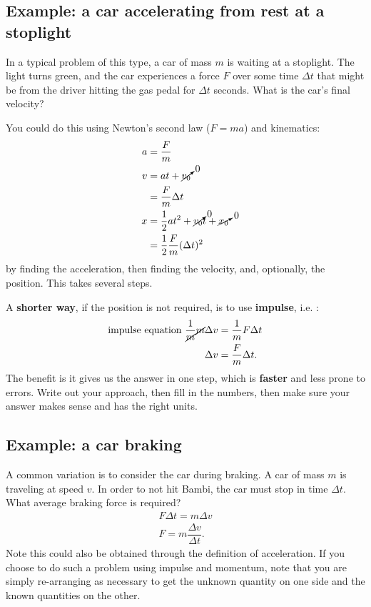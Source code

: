 \documentclass[handout]{tufte-handout}
\begin{document}
\subsection{Example: a car accelerating from rest at a stoplight}
In a typical problem of this type, a car of mass $m$ is waiting at a stoplight. The light turns green, and the car experiences a force $F$ over some time $\Delta t$ that might be from the driver hitting the gas pedal for $\Delta t$ seconds. What is the car's final velocity? 

You could do this using Newton's second law ($F=ma$) and kinematics:
\begin{align}
a &= \dfrac{F}{m} \\
v &= a t + \cancelto{0}{v_0} \\
&= \dfrac{F}{m} \Delta t \\
x &= \dfrac{1}{2} a t^2 + \cancelto{0}{v_0} t + \cancelto{0}{x_0} \\
&= \dfrac{1}{2} \dfrac{F}{m} (\Delta t)^2
\end{align}
by finding the acceleration, then finding the velocity, and, optionally, the position. This takes several steps. 

A \textbf{shorter way}, if the position is not required, is to use \textbf{impulse}, i.e. :
\begin{align}
\text{impulse equation}\ \dfrac{1}{\cancel{m}} \cancel{m} \Delta v &= \dfrac{1}{m} F \Delta t \\
\Delta v &= \dfrac{F}{m} \Delta t.
\end{align}
The benefit is it gives us the answer in one step, which is \textbf{faster} and less prone to errors.  Write out your approach, then fill in the numbers, then make sure your answer makes sense and has the right units. 

\subsection{Example: a car braking}
A common variation is to consider the car during braking. A car of mass $m$ is traveling at speed $v$. In order to not hit Bambi, the car must stop in time $\Delta t$. What average braking force is required? 
\begin{align}
F \Delta t = m \Delta v \\
F = m \dfrac{\Delta v}{\Delta t}.
\end{align}
Note this could also be obtained through the definition of acceleration. If you choose to do such a problem using impulse and momentum, note that you are simply re-arranging  as necessary to get the unknown quantity on one side and the known quantities on the other. 
 
\end{document}
